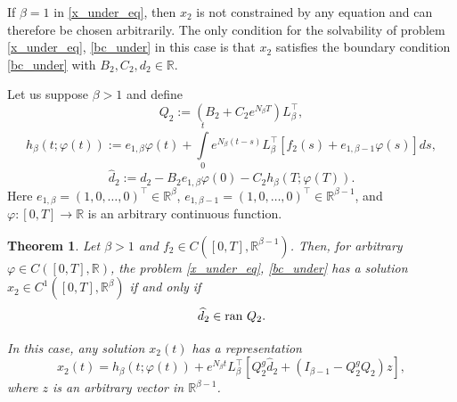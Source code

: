 \documentclass[preprint,12pt]{elsarticle}
\numberwithin{equation}{section}
\newtheorem{theorem}{Theorem}[section]
\theoremstyle{definition}
\begin{document}
If $\beta=1$ in \eqref{x_under_eq}, then $x_2$ is not constrained by any equation and can therefore be chosen arbitrarily. The only condition for the solvability of problem \eqref{x_under_eq}, \eqref{bc_under} in this case is that $x_2$ satisfies the boundary condition \eqref{bc_under} with $B_2, C_2, d_2\in \mathbb{R}$.

Let us suppose $\beta>1$ and define
    \begin{equation}\label{Q2}
Q_2:=\left(B_2+C_2e^{N_{\beta}T}\right)L_{\beta}^\top,
    \end{equation}
    \begin{equation}\label{h_beta}
h_{\beta}(t; \varphi(t)):=e_{1,\beta}\varphi(t)+\int\limits_0^t e^{N_{\beta}(t-s)}L_{\beta}^\top\left[f_2(s)+e_{1,\beta-1}\varphi(s)\right]ds,
    \end{equation}
    \begin{equation}\label{d2}
 \widehat{d}_2:=d_2-B_2e_{1,\beta}\varphi(0)-C_2 h_{\beta}(T;  \varphi(T)).
    \end{equation}
  Here  $e_{1,\beta}=(1,0,\ldots,0)^\top\in \mathbb{R}^{\beta}$, $e_{1,\beta-1}=(1,0,\ldots,0)^\top\in \mathbb{R}^{\beta-1}$, and $\varphi:[0,T]\rightarrow \mathbb{R}$ is an arbitrary continuous function.
\begin{theorem}\label{th_under_part}
   Let $\beta>1$ and $f_2\in C([0,T],\mathbb{R}^{\beta-1})$. Then, for arbitrary $\varphi\in C([0,T],\mathbb{R})$, the problem \eqref{x_under_eq}, \eqref{bc_under} has a solution $x_2\in C^1([0,T],\mathbb{R}^{\beta})$ if and only if \begin{equation*}\label{d_2_orth}
    \widehat{d}_2\in \textnormal{ran}~ Q_2.
    \end{equation*}

 In this case, any solution $x_2(t)$ has a representation
\begin{equation}\label{sol_x2_gen}
    x_2(t)=h_{\beta}(t; \varphi(t))+ e^{N_{\beta}t}L_{\beta}^\top\left[Q_2^g\widehat{d}_2+(I_{\beta-1}-Q_2^g Q_2)z\right],
\end{equation} where  $z$ is an arbitrary vector in $\mathbb{R}^{\beta-1}$.
\end{theorem}
\end{document}
